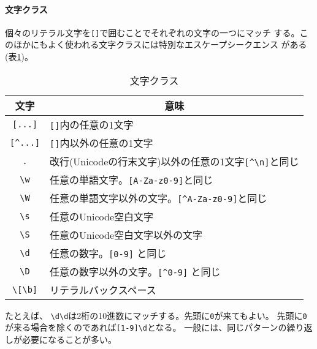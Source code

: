 \paragraph{文字クラス}
個々のリテラル文字を\texttt{[]}で囲むことでそれぞれの文字の一つにマッチ
する。このほかにもよく使われる文字クラスには特別なエスケープシークエンス
がある(表\ref{characterclass})。
\begin{table}[ht]
 \caption{文字クラス}\label{characterclass}
\begin{center}
 \begin{tabular}{|c|l|}\hline
  文字&\multicolumn{1}{c|}{意味}\\\hline
  \texttt{[...]}&\texttt{[]}内の任意の1文字\\\hline
  \Verb+[^...]+& \texttt{[]}内以外の任意の1文字\\ \hline
  \Verb+.+& 改行(Unicodeの行末文字)以外の任意の1文字\Verb+[^\n]+と同じ\\ \hline
  \Verb+\w+& 任意の単語文字。\Verb+[A-Za-z0-9]+と同じ\\ \hline
  \Verb+\W+& 任意の単語文字以外の文字。\Verb+[^A-Za-z0-9]+と同じ\\ \hline
  \Verb+\s+& 任意のUnicode空白文字\\ \hline
  \Verb+\S+& 任意のUnicode空白文字以外の文字\\ \hline
  \Verb+\d+& 任意の数字。\Verb+[0-9]+ と同じ\\ \hline
  \Verb+\D+&任意の数字以外の文字。\Verb+[^0-9]+ と同じ\\\hline
  \Verb+\[\b]+& リテラルバックスペース\\ \hline
 \end{tabular}
\end{center}
\end{table}

たとえば、 \Verb+\d\d+は2桁の10進数にマッチする。先頭に\Verb+0+が来てもよい。
       先頭に\Verb+0+が来る場合を除くのであれば\Verb+[1-9]\d+となる。
一般には、同じパターンの繰り返しが必要になることが多い。
